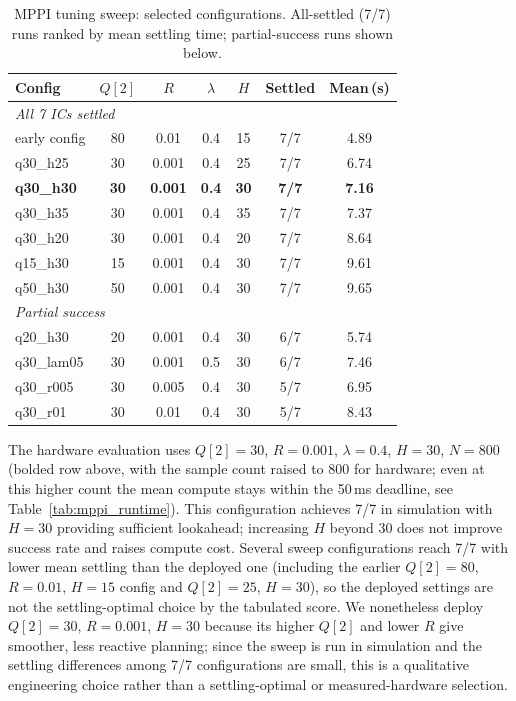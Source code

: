 \begin{table}[!t]
\centering
\caption{MPPI tuning sweep: selected configurations.
  All-settled (7/7) runs ranked by mean settling time;
  partial-success runs shown below.}
\begin{tabular}{lcccccc}
\toprule
\textbf{Config} & $Q[2]$ & $R$ & $\lambda$ & $H$ & \textbf{Settled} & \textbf{Mean\,(s)} \\
\midrule
\multicolumn{7}{l}{\textit{All 7 ICs settled}} \\
early config & 80 & 0.01 & 0.4 & 15 & 7/7 & 4.89 \\
q30\_h25 & 30 & 0.001 & 0.4 & 25 & 7/7 & 6.74 \\
\textbf{q30\_h30} & \textbf{30} & \textbf{0.001} & \textbf{0.4} & \textbf{30} & \textbf{7/7} & \textbf{7.16} \\
q30\_h35 & 30 & 0.001 & 0.4 & 35 & 7/7 & 7.37 \\
q30\_h20 & 30 & 0.001 & 0.4 & 20 & 7/7 & 8.64 \\
q15\_h30 & 15 & 0.001 & 0.4 & 30 & 7/7 & 9.61 \\
q50\_h30 & 50 & 0.001 & 0.4 & 30 & 7/7 & 9.65 \\
\midrule
\multicolumn{7}{l}{\textit{Partial success}} \\
q20\_h30 & 20 & 0.001 & 0.4 & 30 & 6/7 & 5.74 \\
q30\_lam05 & 30 & 0.001 & 0.5 & 30 & 6/7 & 7.46 \\
q30\_r005 & 30 & 0.005 & 0.4 & 30 & 5/7 & 6.95 \\
q30\_r01 & 30 & 0.01 & 0.4 & 30 & 5/7 & 8.43 \\
\bottomrule
\end{tabular}
\end{table}

The hardware evaluation uses $Q[2]=30$, $R=0.001$, $\lambda=0.4$, $H=30$,
$N=800$ (bolded row above, with the sample count raised to 800 for
hardware; even at this higher count the mean compute stays within the
50\,ms deadline, see Table~\ref{tab:mppi_runtime}). This configuration
achieves 7/7 in simulation with $H=30$ providing sufficient lookahead;
increasing $H$ beyond 30 does not improve success rate and raises
compute cost. Several sweep configurations reach 7/7 with lower mean settling than the
deployed one (including the earlier $Q[2]=80$, $R=0.01$, $H=15$ config and
$Q[2]=25$, $H=30$), so the deployed settings are not the settling-optimal
choice by the tabulated score. We nonetheless deploy $Q[2]=30$, $R=0.001$,
$H=30$ because its higher $Q[2]$ and lower $R$ give smoother, less reactive
planning; since the sweep is run in simulation and the settling differences
among 7/7 configurations are small, this is a qualitative engineering choice
rather than a settling-optimal or measured-hardware selection.

